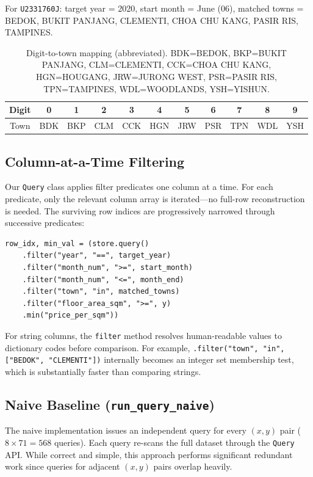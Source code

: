 \documentclass[11pt,a4paper]{article}
\begin{document}
For \texttt{U2331760J}: target year = 2020, start month = June (06), matched towns = BEDOK, BUKIT PANJANG, CLEMENTI, CHOA CHU KANG, PASIR RIS, TAMPINES.

\begin{table}[H]
\centering
\small
\begin{tabular}{c|cccccccccc}
\toprule
Digit & 0 & 1 & 2 & 3 & 4 & 5 & 6 & 7 & 8 & 9 \\
\midrule
Town & BDK & BKP & CLM & CCK & HGN & JRW & PSR & TPN & WDL & YSH \\
\bottomrule
\end{tabular}
\caption{Digit-to-town mapping (abbreviated). BDK=BEDOK, BKP=BUKIT PANJANG, CLM=CLEMENTI, CCK=CHOA CHU KANG, HGN=HOUGANG, JRW=JURONG WEST, PSR=PASIR RIS, TPN=TAMPINES, WDL=WOODLANDS, YSH=YISHUN.}
\label{tab:towns}
\end{table}

\subsection{Column-at-a-Time Filtering}

Our \texttt{Query} class applies filter predicates one column at a time. For each predicate, only the relevant column array is iterated---no full-row reconstruction is needed. The surviving row indices are progressively narrowed through successive predicates:

\begin{lstlisting}[caption={Chainable query API usage}]
row_idx, min_val = (store.query()
    .filter("year", "==", target_year)
    .filter("month_num", ">=", start_month)
    .filter("month_num", "<=", month_end)
    .filter("town", "in", matched_towns)
    .filter("floor_area_sqm", ">=", y)
    .min("price_per_sqm"))
\end{lstlisting}

For string columns, the \texttt{filter} method resolves human-readable values to dictionary codes before comparison. For example, \texttt{.filter("town", "in", ["BEDOK", "CLEMENTI"])} internally becomes an integer set membership test, which is substantially faster than comparing strings.

\subsection{Naive Baseline (\texttt{run\_query\_naive})}

The naive implementation issues an independent query for every $(x, y)$ pair ($8 \times 71 = 568$ queries). Each query re-scans the full dataset through the \texttt{Query} API. While correct and simple, this approach performs significant redundant work since queries for adjacent $(x, y)$ pairs overlap heavily.
\end{document}

